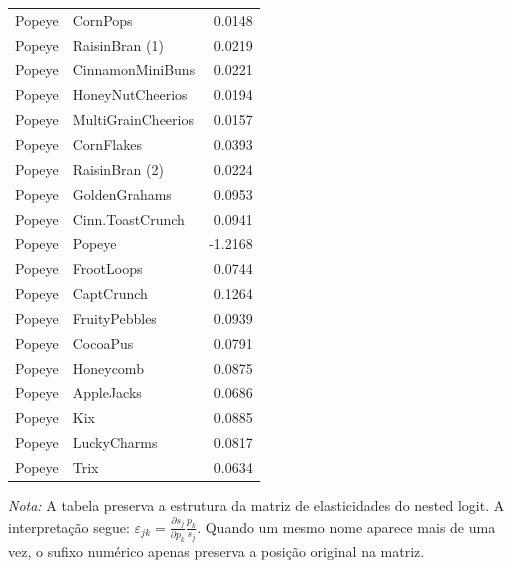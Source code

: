 \begin{table}[H]
\begin{tabular}{llr}
Popeye & CornPops & 0.0148 \\
Popeye & RaisinBran (1) & 0.0219 \\
Popeye & CinnamonMiniBuns & 0.0221 \\
Popeye & HoneyNutCheerios & 0.0194 \\
Popeye & MultiGrainCheerios & 0.0157 \\
Popeye & CornFlakes & 0.0393 \\
Popeye & RaisinBran (2) & 0.0224 \\
Popeye & GoldenGrahams & 0.0953 \\
Popeye & Cinn.ToastCrunch & 0.0941 \\
Popeye & Popeye & -1.2168 \\
Popeye & FrootLoops & 0.0744 \\
Popeye & CaptCrunch & 0.1264 \\
Popeye & FruityPebbles & 0.0939 \\
Popeye & CocoaPus & 0.0791 \\
Popeye & Honeycomb & 0.0875 \\
Popeye & AppleJacks & 0.0686 \\
Popeye & Kix & 0.0885 \\
Popeye & LuckyCharms & 0.0817 \\
Popeye & Trix & 0.0634 \\
\bottomrule
\end{tabular}

\vspace{0.3em}
\footnotesize
\textit{Nota:} A tabela preserva a estrutura da matriz de elasticidades do nested logit. A interpretação segue: $\varepsilon_{jk}=\frac{\partial s_j}{\partial p_k}\frac{p_k}{s_j}$. Quando um mesmo nome aparece mais de uma vez, o sufixo numérico apenas preserva a posição original na matriz.
\end{table}
\endgroup


